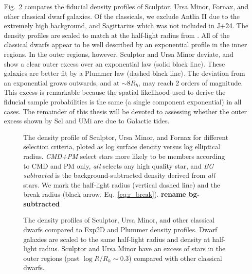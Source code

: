 Fig.~\ref{fig:classical_dwarfs_densities} compares the fiducial density
profiles of Sculptor, Ursa Minor, Fornax, and other classical dwarf
galaxies. Of the classicals, we exclude Antlia II due to the extremely
high background, and Sagittarius which was not included in J+24. The
density profiles are scaled to match at the half-light radius from
\citet{munoz+2018}. All of the classical dwarfs appear to be well
described by an exponential profile in the inner regions. In the outer
regions, however, Sculptor and Ursa Minor deviate, and show a clear
outer excess over an exponential law (solid black line). These galaxies
are better fit by a Plummer law (dashed black line). The deviation from
an exponential grows outwards, and at \(\sim 8 R_h\), may reach 2 orders
of magnitude. This excess is remarkable because the spatial likelihood
used to derive the fiducial sample probabilities is the same (a single
component exponential) in all cases. The remainder of this thesis will
be devoted to assessing whether the outer excess shown by Scl and UMi
are due to Galactic tides.

\begin{figure}
\centering
{}
\caption[Sculptor density profiles]{The density profile of Sculptor,
Ursa Minor, and Fornax for different selection criteria, ploted as log
surface dencity versus log elliptical radius. \emph{CMD+PM} select stars
more likely to be members according to CMD and PM only, \emph{all}
selects any high quality star, and \emph{BG subtracted} is the
background-subtracted density derived from \emph{all} stars. We mark the
half-light radius (vertical dashed line) and the break radius (black
arrow, Eq.~\ref{eq:r_break}). \textbf{rename
bg-subtracted}}\label{fig:scl_observed_profiles}
\end{figure}

\begin{figure}
\centering
{}
\caption[Classical dwarf density profiles]{The density profiles of
Sculptor, Ursa Minor, and other classical dwarfs compared to Exp2D and
Plummer density profiles. Dwarf galaxies are scaled to the same
half-light radius and density at half-light radius. Sculptor and Ursa
Minor have an excess of stars in the outer regions (past
\(\log R/R_h \sim 0.3\)) compared with other classical
dwarfs.}\label{fig:classical_dwarfs_densities}
\end{figure}
